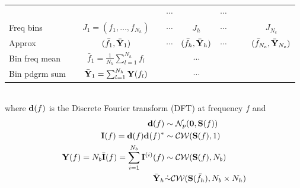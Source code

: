 \documentclass[landscape, a4paper, 11pt]{article}
\renewcommand{\d}{{\bf d}}
\newcommand{\Y}{{\bf Y}}
\renewcommand{\S}{{\bf S}}
\renewcommand{\0}{{\bf 0}}
\renewcommand{\I}{{\bf I}}
\begin{document}
\begin{tabular}{lccccccccc}
		                           & \multicolumn{3}{c}{\upbracefill}                                   & $\cdots$                                             & \multicolumn{1}{c}{\upbracefill}                                       & $\cdots$ & \multicolumn{3}{c}{\upbracefill} \\
		Freq bins                  &                                                                    & $J_{1} = (f_{1}, \dots, f_{N_h})$                    &                                                                        & $\cdots$ & $J_{h}$                         & $\cdots$ &  &  & $J_{N_c}$                                                              \\
		Approx                     &                                                                    & $(\bar{f}_{1},\bar{\Y}_{1})$                         &                                                                        & $\cdots$ & $(\bar{f}_{h},\bar{\Y}_{h})$    & $\cdots$ &  &  & $(\bar{f}_{N_c},\bar{\Y}_{N_c})$                                       \\
		Bin freq mean              &                                                                    & $\bar{f}_{1} = \frac{1}{N_{h}}\sum_{l=1}^{N_h}f_{l}$ &                                                                        &          & $\cdots$                        &          &  &  &                                                                        \\
		Bin pdgrm sum              &                                                                    & $\bar{\Y}_{1} = \sum_{l=1}^{N_h}\Y(f_{l})$           &                                                                        &          & $\cdots$                        &          &  &  &                                                                        \\
	\end{tabular}\\

	\vspace{1em}
	where $\d(f)$ is the Discrete Fourier transform (DFT) at frequency $f$ and
	\begin{align*}
		\d(f)                                                   & \sim{\cal N}_{p}(\0, \S(f))                              \\
		\I(f) = \d(f)\d(f)^{*}                                  & \sim{\cal CW}(\S(f), 1)                                  \\
		\Y(f) = N_{b} \bar{\I}(f) = \sum_{i=1}^{N_b}\I^{(i)}(f) & \sim{\cal CW}(\S(f), N_{b})                              \\
		\bar{\Y}_{h}                                            & \dot{\sim}{\cal CW}(\S(\bar{f}_{h}), N_{b} \times N_{h})
	\end{align*}
\end{document}
